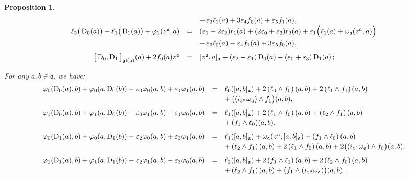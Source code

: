 \documentclass[final,1p,times,nopreprintline]{elsarticle}
\newtheorem{proposition}{Proposition}[section]
\theoremstyle{definition}
\numberwithin{equation}{section}
\newcommand{\w}{\omega}
\newcommand{\ai}{\mathfrak{a}}
\numberwithin{equation}{section}
\newcommand{\D}{\operatorname{D}}
\newcommand{\gl}{\mathfrak{gl}}
\begin{document}
\begin{proposition}
\begin{equation*}
\begin{array}{r c l}
	&&+\,\varepsilon_3\ell_1(a)+3\varepsilon_4f_0(a)+\varepsilon_5f_1(a),\\\vspace{0.75mm}
	\ell_2\big(\D_0(a)\big)-\ell_1\big(\D_1(a)\big)+\varphi_1(z^\ai,a)&=&(\varepsilon_1-2\varepsilon_2)\ell_1(a)+(2\varepsilon_0+\varepsilon_3)\ell_2(a)+\varepsilon_1\Big(\ell_1(a)+\w_\ai(z^\ai,a)\Big)\\\vspace{2.5mm}
	&&-\,\varepsilon_3\ell_0(a)-\varepsilon_4f_1(a)+3\varepsilon_5f_0(a),\\
	\big[\D_0,\D_1\big]_{\gl(\ai)}(a)+2f_0(a)z^\ai&=&[z^\ai,a]_\ai+(\varepsilon_2-\varepsilon_1)\D_0(a)-(\varepsilon_0+\varepsilon_3)\D_1(a)\,;
	\end{array}
\end{equation*}
	\item[$10.$] For any $a,b\in\ai$, we have:
	\begin{equation*}
		\begin{array}{r c l}\vspace{0.75mm}
		\varphi_0(\D_0(a),b)+\varphi_0(a,\D_0(b))-\varepsilon_0\varphi_0(a,b)+\varepsilon_1\varphi_1(a,b)&=&\ell_0([a,b]_\ai)+2\left(\ell_0\wedge f_0\right)(a,b)+2\left(\ell_1\wedge f_1\right)(a,b)\\\vspace{2.5mm}
		&&+\,\big((i_{z^\ai}\w_\ai)\wedge f_1\big)(a,b),\\\vspace{0.75mm}
		\varphi_1(\D_0(a),b)+\varphi_1(a,\D_0(b))-\varepsilon_0\varphi_1(a,b)-\varepsilon_1\varphi_0(a,b)&=&\ell_1([a,b]_\ai)+2\left(\ell_1\wedge f_0\right)(a,b)+\left(\ell_2\wedge f_1\right)(a,b)\\\vspace{2.5mm}
		&&+\,(f_1\wedge \ell_0)(a,b),\\\vspace{0.75mm}
		\varphi_0(\D_1(a),b)+\varphi_0(a,\D_1(b))-\varepsilon_2\varphi_0(a,b)+\varepsilon_3\varphi_1(a,b)&=&\ell_1([a,b]_\ai)+\w_\ai(z^\ai,[a,b]_\ai)+\left(f_1\wedge \ell_0\right)(a,b)\\\vspace{2.5mm}
		&&+\left(\ell_2\wedge f_1\right)(a,b)+2\left(\ell_1\wedge f_0\right)(a,b)+2\big((i_{z^\ai}\w_\ai)\wedge f_0\big)(a,b),\\\vspace{0.75mm}
		\varphi_1(\D_1(a),b)+\varphi_1(a,\D_1(b))-\varepsilon_2\varphi_1(a,b)-\varepsilon_3\varphi_0(a,b)&=&\ell_2([a,b]_\ai)+2\left(f_1\wedge \ell_1\right)(a,b)+2\left(\ell_2\wedge f_0\right)(a,b)\\
		&&+\left(\ell_2\wedge f_1\right)(a,b)+\big(f_1\wedge(i_{z^\ai}\w_\ai)\big)(a,b).\end{array}
	\end{equation*}
\end{proposition}
\end{document}
